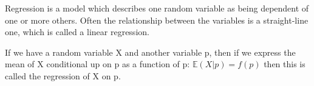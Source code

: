 Regression is a model which describes one random variable as being
dependent of one or more others. Often the relationship between the
variables is a straight-line one, which is called a linear regression.
\par
If we have a random variable X and another variable p, then if we express
the mean of X conditional up on p as a function of p: $ \mathbb{E} ( X | p ) = f(p) $
then this is called the regression of X on p.